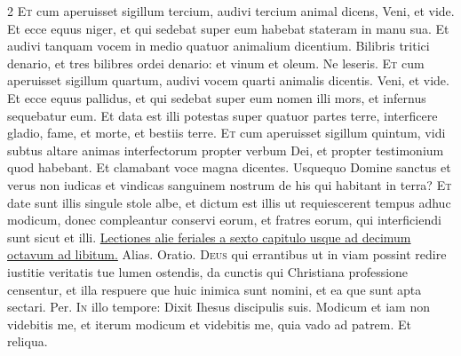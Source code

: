 \begin{multicols*}{2}
\lettrine[lines=2]{\zallmancaps \color{Red} E}{t} cum aperuisset sigillum tercium, audivi tercium animal dicens, Veni, et vide. Et ecce equus niger, et qui sedebat super eum habebat stateram in manu sua. Et audivi tanquam vocem in medio quatuor animalium dicentium. Bilibris tritici denario, et tres bilibres ordei denario: et vinum et oleum. Ne leseris.
\lettrine[lines=2]{\zallmancaps \color{Blue} E}{t} cum aperuisset sigillum quartum, audivi vocem quarti animalis dicentis. Veni, et vide. Et ecce equus pallidus, et qui sedebat super eum nomen illi mors, et infernus sequebatur eum. Et data est illi potestas super quatuor partes terre, interficere gladio, fame, et morte, et bestiis terre.
\lettrine[lines=2]{\zallmancaps \color{Red} E}{t} cum aperuisset sigillum quintum, vidi subtus altare animas interfectorum propter verbum Dei, et propter testimonium quod habebant. Et clamabant voce magna dicentes. Usquequo Domine sanctus et verus non iudicas et vindicas sanguinem nostrum de his qui habitant in terra?
\lettrine[lines=2]{\zallmancaps \color{Blue} E}{t} date sunt illis singule stole albe, et dictum est illis ut requiescerent tempus adhuc modicum, donec compleantur conservi eorum, et fratres eorum, qui interficiendi sunt sicut et illi.
\newline \ul{Lectiones alie feriales a sexto capitulo usque ad decimum octavum ad libitum.}
{\color{Red} }
 Alias. {\color{Red} Oratio.}
\lettrine[lines=2]{\zallmancaps \color{Red} D}{eus} qui errantibus ut in viam possint redire iustitie veritatis tue lumen ostendis, da cunctis qui Christiana professione censentur, et illa respuere que huic inimica sunt nomini, et ea que sunt apta sectari. Per.
\lettrine[lines=2]{\zallmancaps \color{Blue} I}{n} illo tempore: Dixit Ihesus discipulis suis. Modicum et iam non videbitis me, et iterum modicum et videbitis me, quia vado ad patrem. Et reliqua.

\end{multicols*}
